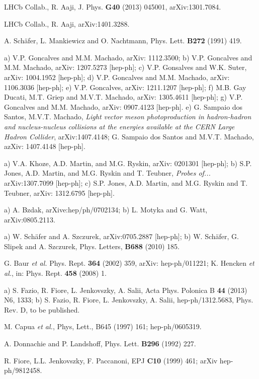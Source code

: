 \documentclass[12pt]{article}
\begin{document}
\begin{thebibliography}{99}
 LHCb Collab., R. Aaji, J. Phys. {\bf G40} (2013) 045001, arXiv:1301.7084.

  LHCb Collab., R. Aaji, arXiv:1401.3288.

 A. Sch\"afer, L. Mankiewicz and O. Nachtmann, Phys. Lett. {\bf B272} (1991) 419.

 a) V.P. Goncalves and M.M. Machado, arXiv: 1112.3500;
b) V.P. Goncalves and M.M. Machado, arXiv: 1207.5273 [hep-ph]; c) V.P. Gonsalves and W.K. Suter, arXiv: 1004.1952 [hep-ph];
d) V.P. Goncalves and M.M. Machado, arXiv: 1106.3036 [hep-ph]; e) V.P. Goncalves,
arXiv: 1211.1207 [hep-ph]; f) M.B. Gay Ducati, M.T. Griep and M.V.T. Machado, arXiv: 1305.4611 [hep-ph];
g) V.P. Goncalves and M.M. Machado, arXiv: 0907.4123 [hep-ph].
e)  G. Sampaio dos Santos, M.V.T. Machado, {\it Light vector meson photoproduction in hadron-hadron and nucleus-nucleus collisions at the energies available at the CERN Large Hadron Collider}, arXiv:1407.4148; G. Sampaio dos Santos and M.V.T. Machado, azXiv: 1407.4148 [hep-ph].


 a) V.A. Khoze, A.D. Martin, and M.G. Ryskin, arXiv: 0201301 [hep-ph];
b) S.P. Jones, A.D. Martin, and M.G. Ryskin and T. Teubner, {\it Probes of...} arXiv:1307.7099 [hep-ph];
c) S.P. Jones, A.D. Martin, and M.G. Ryskin and T. Teubner, arXiv: 1312.6795 [hep-ph].

 a) A. Bzdak, arXive:hep/ph/0702134; b) L. Motyka and G. Watt, arXiv:0805.2113.

 a) W. Sch\"afer and A. Szczurek, arXiv:0705.2887 [hep-ph]; b) W. Sch\"afer, G. Slipek and A. Szczurek,
Phys. Letters, {\bf B688} (2010) 185.


 G. Baur {\it et al.} Phys. Rept. {\bf 364} (2002) 359, arXiv: hep-ph/011221; K. Hencken {\it et al.}, in: Phys. Rept. {\bf 458} (2008) 1.

 a) S. Fazio, R. Fiore, L. Jenkovszky, A. Salii, Acta Phys. Polonica B {\bf 44} (2013) N6, 1333; b) S. Fazio, R. Fiore, L. Jenkovszky, A. Salii,
hep-ph/1312.5683, Phys. Rev. D, to be published. 

 M. Capua {\it et al.}, Phys, Lett., {B645} (1997) 161; hep-ph/0605319.



 A. Donnachie and P. Landshoff, Phys. Lett. {\bf B296} (1992) 227.

 R. Fiore, L.L. Jenkovszky, F. Paccanoni, EPJ {\bf C10} (1999) 461; arXiv hep-ph/9812458.




\end{thebibliography}
\end{document}
